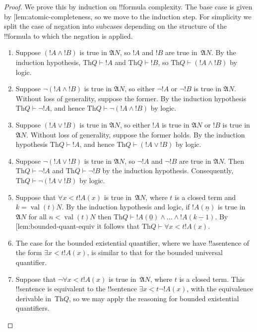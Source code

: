 \documentclass[10pt,a4paper]{article}
\makeatletter
\theoremstyle{plain}
\theoremstyle{definition}
\theoremstyle{remark}
\newcommand{\olref}{\@ifnextchar[{\olref@i}{\olref@final}}
\def\olref@i[#1]{\@ifnextchar[{\olref@ii}{\olref@final}}
\def\olref@ii[#1]{\@ifnextchar[{\olref@iii}{\olref@final}}
\def\olref@iii[#1]{\olref@final}
\def\olref@final#1{\ref{#1}}
\providecommand{\Proves}{\mathrel{\vdash}}
\providecommand{\Struct}{\ensuremath{\mathfrak{A}}}
\providecommand{\Th}{\ensuremath{\mathrm{Th}}}
\providecommand{\num}[1]{\underline{#1}}
\providecommand{\Value}[1]{\operatorname{val}(#1)}
\providecommand{\bforall}{\forall}
\providecommand{\bexists}{\exists}
\makeatother
\begin{document}
\begin{proof}
We prove this by induction on !!{formula} complexity.
%
The base case is given by \olref{lem:atomic-completeness},
so we move to the induction step. For simplicity we split
the case of negation into subcases depending on the
structure of the !!{formula} to which the negation is
applied.

\begin{enumerate}
\item Suppose $(!A \land !B)$ is true in $\Struct{N}$,
so $!A$ and $!B$ are true in~$\Struct{N}$.
By the induction hypothesis, $\Th{Q} \Proves !A$ and
$\Th{Q} \Proves !B$,
so $\Th{Q} \Proves (!A \land !B)$ by logic.
%
\item Suppose $\lnot (!A \land !B)$ is true in $\Struct{N}$,
so either $\lnot !A$ or $\lnot !B$ is true in $\Struct{N}$.
Without loss of generality, suppose the former. By the
induction hypothesis $\Th{Q} \Proves \lnot !A$, and hence
$\Th{Q} \Proves \lnot (!A \land !B)$ by logic.
%
\item Suppose $(!A \lor !B)$ is true in $\Struct{N}$, so
either $!A$ is true in $\Struct{N}$ or $!B$ is true in
$\Struct{N}$. Without loss of generality, suppose the former
holds. By the induction hypothesis $\Th{Q} \Proves !A$, and
hence $\Th{Q} \Proves (!A \lor !B)$ by logic.
%
\item Suppose $\lnot(!A \lor !B)$ is true in $\Struct{N}$,
so $\lnot !A$ and $\lnot !B$ are true in $\Struct{N}$.
Then $\Th{Q} \Proves \lnot !A$ and $\Th{Q} \Proves \lnot !B$
by the induction hypothesis. Consequently,
$\Th{Q} \Proves \lnot(!A \lor !B)$ by logic.
%
\item Suppose that $\bforall{x<t}{!A(x)}$ is true 
in~$\Struct{N}$, where $t$ is a closed term and $k=\Value{t}{N}$. By the induction
hypothesis and logic, if $!A(\num n)$ is true in~$\Struct{N}$
for all $n < \Value{t}{N}$ then $\Th{Q} \Proves
!A(\num 0) \land \dots \land !A(\num{k-1})$.
By \olref{lem:bounded-quant-equiv} it follows that
$\Th{Q} \Proves \bforall{x<t}{!A(x)}$.
%
\item The case for the bounded existential quantifier, where
we have !!a{sentence} of the form $\bexists{x < t}{!A(x)}$,
is similar to that for the bounded universal quantifier.
%
\item Suppose that $\lnot \bforall{x<t}{!A(x)}$ is true 
in~$\Struct{N}$, where $t$ is a closed term. This !!{sentence}
is equivalent to the !!{sentence} $\bexists{x<t}{\lnot !A(x)}$,
with the equivalence derivable in~$\Th{Q}$, so we may apply
the reasoning for bounded existential quantifiers.

\end{enumerate}
\end{proof}
\end{document}
